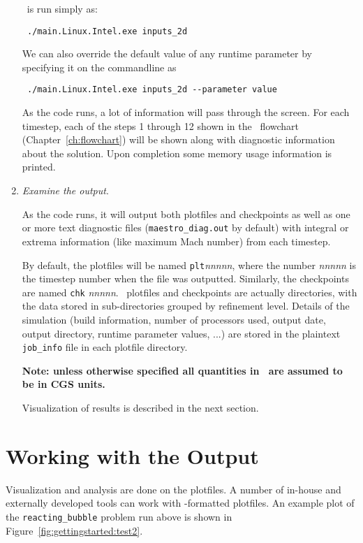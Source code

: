 \begin{enumerate}
  \maestro\ is run simply as:
  \begin{verbatim}
 ./main.Linux.Intel.exe inputs_2d
  \end{verbatim}
  We can also override the default value of any runtime parameter by
  specifying it on the commandline as
  \begin{verbatim}
 ./main.Linux.Intel.exe inputs_2d --parameter value
  \end{verbatim}

  As the code runs, a lot of information will pass through the screen.
  For each timestep, each of the steps 1 through 12 shown in the
  \maestro\ flowchart (Chapter~\ref{ch:flowchart}) will be shown along
  with diagnostic information about the solution.  Upon completion
  some memory usage information is printed.


\item {\em Examine the output}.
  
  As the code runs, it will output both plotfiles and checkpoints as
  well as one or more text diagnostic files ({\tt maestro\_diag.out}
  by default) with integral or extrema information (like maximum Mach
  number) from each timestep.

  By default, the plotfiles will be named {\tt plt}{\em nnnnn}, where
  the number {\em nnnnn} is the timestep number when the file was
  outputted.  Similarly, the checkpoints are named {\tt chk}{\em
    nnnnn}.  \boxlib\ plotfiles and checkpoints are actually
  directories, with the data stored in sub-directories grouped by
  refinement level.  Details of the simulation (build information,
  number of processors used, output date, output directory, runtime
  parameter values, ...)  are stored in the plaintext {\tt job\_info}
  file in each plotfile directory.

  {\bf Note: unless otherwise specified all quantities in
    \maestro\ are assumed to be in CGS units.}

  Visualization of results is described in the next section.


\end{enumerate}


\section{Working with the Output}

Visualization and analysis are done on the plotfiles.  A number of
in-house and externally developed tools can work
with \boxlib-formatted plotfiles.  An example plot of the {\tt reacting\_bubble}
problem run above is shown in Figure~\ref{fig:gettingstarted:test2}.


